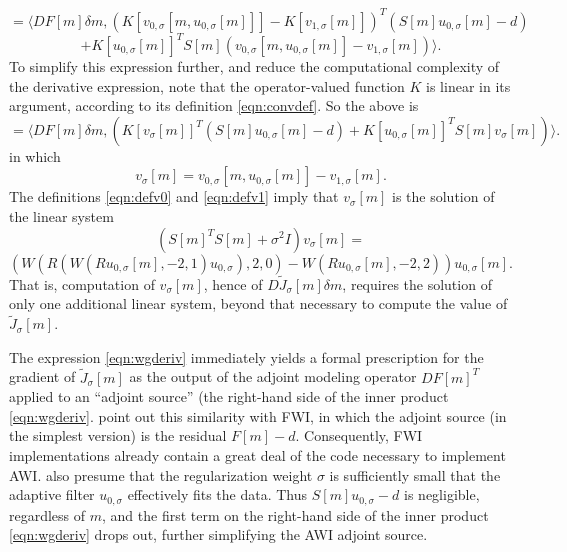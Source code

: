 \[
  = \langle DF[m]\delta
  m,(K[v_{0,\sigma}[m,u_{0,\sigma}[m]]]-K[v_{1,\sigma}[m]])^T(S[m]u_{0,\sigma}[m]-d)
\]
\[
  + K[u_{0,\sigma}[m]]^T S[m] (v_{0,\sigma}[m,u_{0,\sigma}[m]] -
  v_{1,\sigma}[m]) \rangle.
\]
To simplify this expression further, and reduce the computational
complexity of the derivative expression, note that the
operator-valued function $K$ is linear in its argument, according to
its definition \ref{eqn:convdef}. So the above is
\begin{equation}
  \label{eqn:wgderiv}
  = \langle DF[m]\delta m, (K[v_{\sigma}[m]]^T(S[m]u_{0,\sigma}[m]-d) 
  + K[u_{0,\sigma}[m]]^T S[m] v_{\sigma}[m] )\rangle.
\end{equation}
in which
\[
  v_{\sigma}[m] = v_{0,\sigma}[m,u_{0,\sigma}[m]] -  v_{1,\sigma}[m].
\]
The definitions \ref{eqn:defv0} and \ref{eqn:defv1} imply that
$v_{\sigma}[m]$ is the solution of the linear system
\[
    (S[m]^TS[m]+ \sigma^2I) v_{\sigma}[m] =
\]
\begin{equation}
  \label{eqn:defvsigma}
  (W(R(W(Ru_{0,\sigma}[m],-2,1)u_{0,\sigma}),2,0) - W(Ru_{0,\sigma}[m],-2,2))
  u_{0,\sigma}[m].
\end{equation}
That is, computation of $v_{\sigma}[m]$, hence of $D
\tilde{J}_{\sigma}[m]\delta m$, requires the solution of only one additional
linear system, beyond that necessary to compute the value of $\tilde{J}_{\sigma}[m]$.

 The expression \ref{eqn:wgderiv} immediately
yields a formal prescription for the gradient of
$\tilde{J}_{\sigma}[m]$ as the output of the adjoint modeling operator
$DF[m]^T$ applied to an ``adjoint source'' (the right-hand side of the
inner product \ref{eqn:wgderiv}. \cite{Warner:16} point out this
similarity with FWI, in which the adjoint source (in the simplest
version) is the residual $F[m]-d$. Consequently, FWI implementations
already contain a great deal of the code necessary to implement
AWI. \cite{Warner:16} also presume that the regularization weight
$\sigma$ is sufficiently small that the adaptive filter $u_{0,\sigma}$
effectively fits the data. Thus $S[m]u_{0,\sigma}-d$ is negligible,
regardless of $m$, and the first term on the right-hand side of the
inner product \ref{eqn:wgderiv} drops out, further simplifying the AWI
adjoint source.

